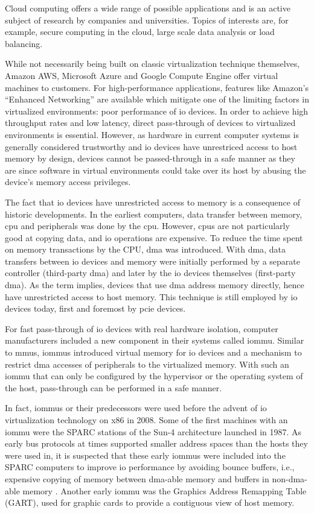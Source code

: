 Cloud computing offers a wide range of possible applications and is an active
subject of research by companies and universities. Topics of interests are, for
example, secure computing in the cloud, large scale data analysis or load
balancing.

While not necessarily being built on classic virtualization technique
themselves, Amazon AWS, Microsoft Azure and Google Compute Engine offer virtual
machines to customers. For high-performance applications, features like Amazon's
``Enhanced Networking'' are available which mitigate one of the limiting factors
in virtualized environments: poor performance of \acs{io} devices. In order to
achieve high throughput rates and low latency, direct pass-through of devices to
virtualized environments is essential. However, as hardware in current computer
systems is generally considered trustworthy and \ac{io} devices have unrestriced
access to host memory by design, devices cannot be passed-through in a safe
manner as they are since software in virtual environments could take over its
host by abusing the device's memory access privileges.

The fact that \ac{io} devices have unrestricted access to memory is a
consequence of historic developments. In the earliest computers, data transfer
between memory, \acs{cpu} and peripherals was done by the \ac{cpu}. However,
\acp{cpu} are not particularly good at copying data, and \ac{io} operations are
expensive. To reduce the time spent on memory transactions by the CPU, \ac{dma}
was introduced. With \ac{dma}, data transfers between \ac{io} devices and memory
were initially performed by a separate controller (third-party \ac{dma}) and
later by the \ac{io} devices themselves (first-party \ac{dma}). As the term
implies, devices that use \ac{dma} address memory directly, hence have
unrestricted access to host memory. This technique is still employed by \ac{io}
devices today, first and foremost by \acs{pcie} devices.

For fast pass-through of \ac{io} devices with real hardware isolation, computer
manufacturers included a new component in their systems called \acf{iommu}.
Similar to \acp{mmu}, \acp{iommu} introduced virtual memory for \ac{io} devices
and a mechanism to restrict \ac{dma} accesses of peripherals to the virtualized
memory. With such an \ac{iommu} that can only be configured by the hypervisor
or the operating system of the host, pass-through can be performed in a safe
manner.

In fact, \acp{iommu} or their predecessors were used before the advent of
\ac{io} virtualization technology on x86 in 2008. Some of the first machines
with an \ac{iommu} were the SPARC stations of the Sun-4 architecture launched in
1987. As early bus protocols at times supported smaller address spaces than the
hosts they were used in, it is suspected that these early \acp{iommu} were
included into the SPARC computers to improve \ac{io} performance by avoiding
bounce buffers, i.e., expensive copying of memory between \ac{dma}-able memory
and buffers in non-\ac{dma}-able memory
\cite[pp.~28~ff.]{rothwell2018exploitation}. Another early \ac{iommu} was the
Graphics Address Remapping Table (GART), used for graphic cards to provide a
contiguous view of host memory.

